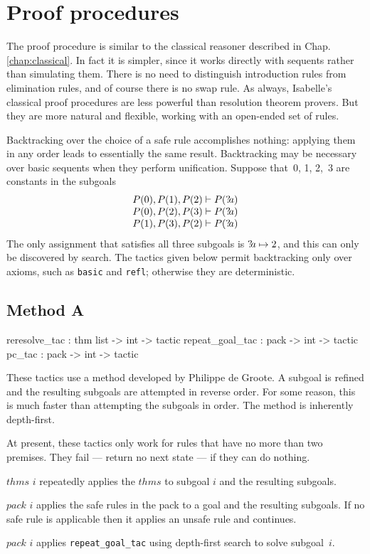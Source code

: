 \section{Proof procedures}

The \LK{} proof procedure is similar to the classical reasoner
described in 
%
            {Chap.\ts\ref{chap:classical}}.  
%
In fact it is simpler, since it works directly with sequents rather than
simulating them.  There is no need to distinguish introduction rules from
elimination rules, and of course there is no swap rule.  As always,
Isabelle's classical proof procedures are less powerful than resolution
theorem provers.  But they are more natural and flexible, working with an
open-ended set of rules.

Backtracking over the choice of a safe rule accomplishes nothing: applying
them in any order leads to essentially the same result.  Backtracking may
be necessary over basic sequents when they perform unification.  Suppose
that~0, 1, 2,~3 are constants in the subgoals
\[  \begin{array}{c}
      P(0), P(1), P(2) \vdash P({?\!a})  \\
      P(0), P(2), P(3) \vdash P({?\!a})  \\
      P(1), P(3), P(2) \vdash P({?\!a})  
    \end{array}
\]
The only assignment that satisfies all three subgoals is ${?\!a}\mapsto 2$,
and this can only be discovered by search.  The tactics given below permit
backtracking only over axioms, such as {\tt basic} and {\tt refl};
otherwise they are deterministic.


\subsection{Method A}
\begin{ttbox} 
reresolve_tac   : thm list -> int -> tactic
repeat_goal_tac : pack -> int -> tactic
pc_tac          : pack -> int -> tactic
\end{ttbox}
These tactics use a method developed by Philippe de Groote.  A subgoal is
refined and the resulting subgoals are attempted in reverse order.  For
some reason, this is much faster than attempting the subgoals in order.
The method is inherently depth-first.

At present, these tactics only work for rules that have no more than two
premises.  They fail --- return no next state --- if they can do nothing.
\begin{ttdescription}
\item[\ttindexbold{reresolve_tac} $thms$ $i$] 
repeatedly applies the $thms$ to subgoal $i$ and the resulting subgoals.

\item[\ttindexbold{repeat_goal_tac} $pack$ $i$] 
applies the safe rules in the pack to a goal and the resulting subgoals.
If no safe rule is applicable then it applies an unsafe rule and continues.

\item[\ttindexbold{pc_tac} $pack$ $i$] 
applies {\tt repeat_goal_tac} using depth-first search to solve subgoal~$i$.
\end{ttdescription}


